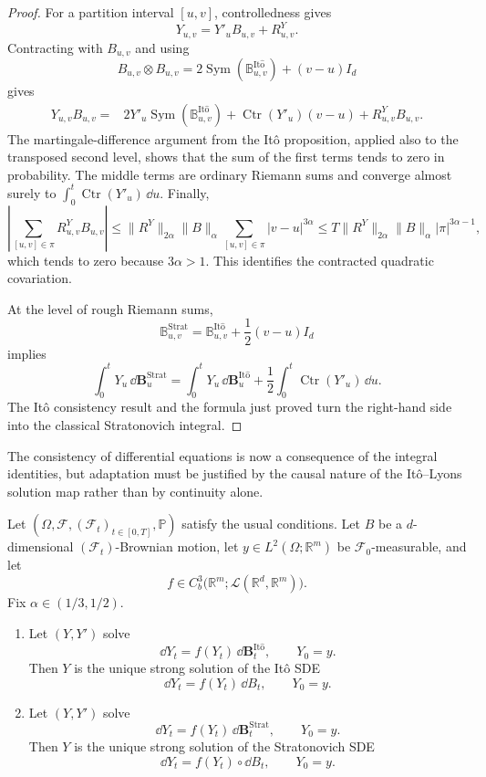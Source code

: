 \begin{proof}
For a partition interval $[u,v]$, controlledness gives
\[
  Y_{u,v}=Y'_uB_{u,v}+R^Y_{u,v}.
\]
Contracting with $B_{u,v}$ and using
\[
  B_{u,v}\otimes B_{u,v}
  =2\operatorname{Sym}(\mathbb B^{\mathrm{It\hat{o}}}_{u,v})
   +(v-u)I_d
\]
gives
\begin{align*}
  Y_{u,v}B_{u,v}
  ={}&2Y'_u\operatorname{Sym}
       (\mathbb B^{\mathrm{It\hat{o}}}_{u,v})
      +\operatorname{Ctr}(Y'_u)(v-u)
      +R^Y_{u,v}B_{u,v}.
\end{align*}
The martingale-difference argument from the It\^o proposition, applied also
to the transposed second level, shows that the sum of the first terms tends to
zero in probability.  The middle terms are ordinary Riemann sums and converge
almost surely to
$\int_0^t\operatorname{Ctr}(Y'_u)\,\dd u$.  Finally,
\[
  \left|\sum_{[u,v]\in\pi}R^Y_{u,v}B_{u,v}\right|
  \le\|R^Y\|_{2\alpha}\|B\|_\alpha
       \sum_{[u,v]\in\pi}|v-u|^{3\alpha}
  \le T\|R^Y\|_{2\alpha}\|B\|_\alpha|\pi|^{3\alpha-1},
\]
which tends to zero because $3\alpha>1$.  This identifies the contracted
quadratic covariation.

At the level of rough Riemann sums,
\[
  \mathbb B^{\mathrm{Strat}}_{u,v}
  =\mathbb B^{\mathrm{It\hat{o}}}_{u,v}+\frac12(v-u)I_d
\]
implies
\[
  \int_0^tY_u\,\dd\mathbf B^{\mathrm{Strat}}_u
  =\int_0^tY_u\,\dd\mathbf B^{\mathrm{It\hat{o}}}_u
   +\frac12\int_0^t\operatorname{Ctr}(Y'_u)\,\dd u.
\]
The It\^o consistency result and the formula just proved turn the right-hand
side into the classical Stratonovich integral.
\end{proof}

The consistency of differential equations is now a consequence of the
integral identities, but adaptation must be justified by the causal nature of
the It\^o--Lyons solution map rather than by continuity alone.

\begin{prop}
Let $(\Omega,\mathcal F,(\mathcal F_t)_{t\in[0,T]},\mathbb P)$ satisfy
the usual conditions.  Let $B$ be a $d$-dimensional
$(\mathcal F_t)$-Brownian motion, let
$y\in L^2(\Omega;\mathbb R^m)$ be $\mathcal F_0$-measurable, and let
\[
  f\in C_b^3\bigl(\mathbb R^m;
       \mathcal L(\mathbb R^d,\mathbb R^m)\bigr).
\]
Fix $\alpha\in(1/3,1/2)$.

\begin{enumerate}
\item Let $(Y,Y')$ solve
\[
  \dd Y_t=f(Y_t)\,\dd\mathbf B^{\mathrm{It\hat{o}}}_t,
  \qquad Y_0=y.
\]
Then $Y$ is the unique strong solution of the It\^o SDE
\[
  \dd Y_t=f(Y_t)\,\dd B_t,
  \qquad Y_0=y.
\]

\item Let $(Y,Y')$ solve
\[
  \dd Y_t=f(Y_t)\,\dd\mathbf B^{\mathrm{Strat}}_t,
  \qquad Y_0=y.
\]
Then $Y$ is the unique strong solution of the Stratonovich SDE
\[
  \dd Y_t=f(Y_t)\circ\dd B_t,
  \qquad Y_0=y.
\]
\end{enumerate}
\end{prop}

